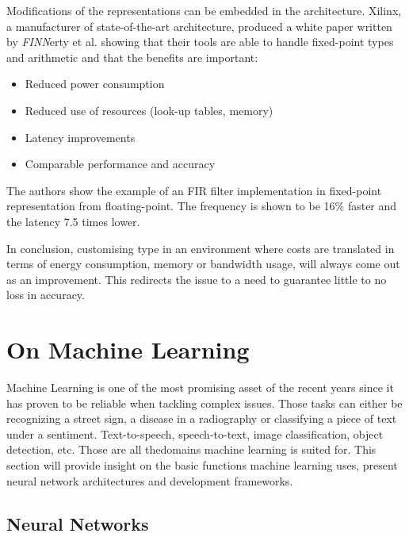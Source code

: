 Modifications of the representations can be embedded in the architecture. Xilinx, a manufacturer of state-of-the-art architecture, produced a white paper written by \emph{FINN}erty et al. \cite{Xilinx2017} showing that their tools are able to handle fixed-point types and arithmetic and that the benefits are important:
\begin{itemize}
  \item Reduced power consumption
  \item Reduced use of resources (look-up tables, memory)
  \item Latency improvements
  \item Comparable performance and accuracy
\end{itemize}
The authors show the example of an FIR filter implementation in fixed-point representation from floating-point. The frequency is shown to be 16\% faster and the latency 7.5 times lower.

In conclusion, customising type in an environment where costs are translated in terms of energy consumption, memory or bandwidth usage, will always come out as an improvement. This redirects the issue to a need to guarantee little to no loss in accuracy.


\section{On Machine Learning}

Machine Learning is one of the most promising asset of the recent years since it has proven to be reliable when tackling complex issues. Those tasks can either be recognizing a street sign, a disease in a radiography or classifying a piece of text under a sentiment. Text-to-speech, speech-to-text, image classification, object detection, etc. Those are all thedomains machine learning is suited for. This section will provide insight on the basic functions machine learning uses, present neural network architectures and development frameworks.


\subsection{Neural Networks}

